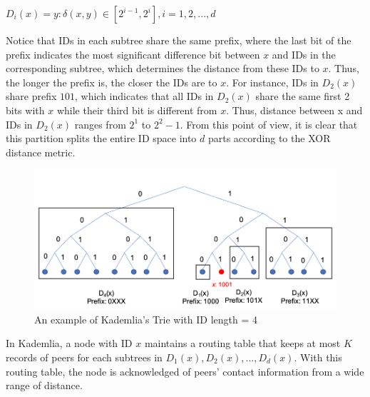 \begin{center}
  $D_{i}(x) = {y: \delta(x,y) \in [2^{i-1}, 2^{i}]}, i = 1, 2, ..., d$
\end{center}

Notice that IDs in each subtree share the same prefix, where the last bit of the prefix indicates the most significant difference bit between $x$ and IDs in the corresponding subtree, which determines the distance from these IDs to $x$. Thus, the longer the prefix is, the closer the IDs are to $x$. For instance, IDs in $D_{2}(x)$ share prefix $101$, which indicates that all IDs in $D_{2}(x)$ share the same first 2 bits with $x$ while their third bit is different from $x$. Thus, distance between x and IDs in $D_{2}(x)$ ranges from $2^{1}$ to $2^{2}-1$. From this point of view, it is clear that this partition splits the entire ID space into $d$ parts according to the XOR distance metric.

\begin{figure}[hbt]
  \centering
    \includegraphics[width=13cm]{figures/bucket_trie.png}
    \caption{An example of Kademlia's Trie with ID length = 4}
    \label{fig:buckettrie}
\end{figure}

In Kademlia, a node with ID $x$ maintains a routing table that keeps at most $K$ records of peers for each subtrees in $D_{1}(x), D_{2}(x), ..., D_{d}(x)$. With this routing table, the node is acknowledged of peers' contact information from a wide range of distance.

\newpage


